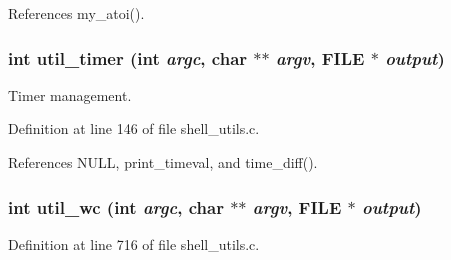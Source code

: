 References my\_\-atoi().
\subsubsection{\setlength{\rightskip}{0pt plus 5cm}int util\_\-timer (int {\em argc}, char $\ast$$\ast$ {\em argv}, FILE $\ast$ {\em output})}\label{shell__utils_8h_a1}


Timer management. 

Definition at line 146 of file shell\_\-utils.c.

References NULL, print\_\-timeval, and time\_\-diff().
\subsubsection{\setlength{\rightskip}{0pt plus 5cm}int util\_\-wc (int {\em argc}, char $\ast$$\ast$ {\em argv}, FILE $\ast$ {\em output})}\label{shell__utils_8h_a7}




Definition at line 716 of file shell\_\-utils.c.